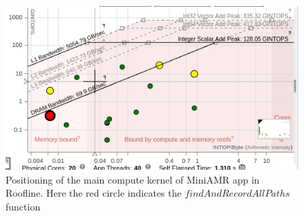 \begin{figure}[h]%
\begin{center}
\includegraphics[width=1\linewidth]{MEMSYS22/figures/roofline/pathfinder.png}
\end{center}
  \vspace{-0.1in}
\caption{Positioning of the main compute kernel of MiniAMR app in Roofline. Here the red circle indicates the $findAndRecordAllPaths$ function }
\label{fig:roof-pathfinder}
\vspace{-0.2in}
\end{figure}



%
%
%
%
%  
%
%
%


